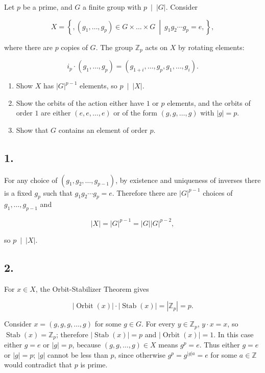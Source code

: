 Let \(p\) be a prime, and \(G\) a finite group with \(\left. p\  \middle| \ |G| \right.\). Consider

\[X = \left\{ ,\left( {g_{1},\ldots,g_{p}} \right) \in G \times \ldots \times G\  \middle| \ g_{1}g_{2}\cdots g_{p} = e, \right\},\]

where there are \(p\) copies of \(G\). The group \(\mathbb{Z}_{p}\) acts on \(X\) by rotating elements:

\[i_{p} \cdot \left( {g_{1},\ldots,g_{p}} \right) = \left( {g_{1 + i},\ldots,g_{p},g_{1},\ldots,g_{i}} \right).\]

\begin{enumerate}
\tightlist
\item
  Show \(X\) has \(|G|^{p - 1}\) elements, so \(\left. p\  \middle| \ |X| \right.\).
\item
  Show the orbits of the action either have \(1\) or \(p\) elements, and the orbits of order \(1\) are either \(\left( {e,e,\ldots,e} \right)\) or of the form \(\left( {g,g,\ldots,g} \right)\) with \(|g| = p\).
\item
  Show that \(G\) contains an element of order \(p\).
\end{enumerate}

\subsection{1.}

For any choice of \(\left( {g_{1},g_{2},\ldots,g_{p - 1}} \right)\), by existence and uniqueness of inverses there is a fixed \(g_{p}\) such that \(g_{1}g_{2}\cdots g_{p} = e\). Therefore there are \(|G|^{p - 1}\) choices of \(g_{1},\ldots,g_{p - 1}\) and

\[|X| = |G|^{p - 1} = |G||G|^{p - 2},\]

so \(\left. p\  \middle| \ |X| \right.\).

\subsection{2.}

For \(x \in X\), the Orbit-Stabilizer Theorem gives

\[\left| {\operatorname{Orbit}(x)} \right| \cdot \left| {\operatorname{Stab}(x)} \right| = \left| \mathbb{Z}_{p} \right| = p.\]

Consider \(x = \left( {g,g,g,\ldots,g} \right)\) for some \(g \in G\). For every \(y \in \mathbb{Z}_{p}\), \(y \cdot x = x\), so \(\operatorname{Stab}(x) = \mathbb{Z}_{p}\); therefore \(\left| {\operatorname{Stab}(x)} \right| = p\) and \(\left| {\operatorname{Orbit}(x)} \right| = 1\). In this case either \(g = e\) or \(|g| = p\), because \(\left( {g,g,\ldots,g} \right) \in X\) means \(g^{p} = e\). Thus either \(g = e\) or \(|g| = p\); \(|g|\) cannot be less than \(p\), since otherwise \(g^{p} = g^{{|g|}a} = e\) for some \(a \in \mathbb{Z}\) would contradict that \(p\) is prime.

